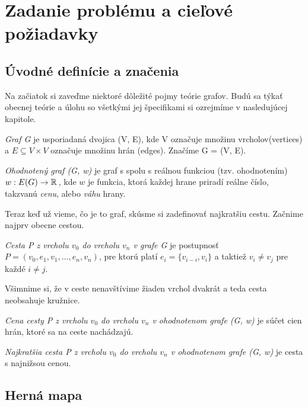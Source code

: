 \chapter{Zadanie problému a cieľové požiadavky}

\section{Úvodné definície a značenia}
Na začiatok si zaveďme niektoré dôležité pojmy teórie grafov.
Budú sa týkať obecnej teórie a úlohu so všetkými jej špecifikami si ozrejmíme v nasledujúcej kapitole.
\begin{define}
{\sl Graf G} je usporiadaná dvojica (V, E), kde V označuje množinu vrcholov(vertices) a $E \subseteq V \times V $ označuje množinu hrán (edges). Značíme G = (V, E).
\end{define}

\begin{define}
{\sl Ohodnotený graf (G, w)} je graf s spolu s reálnou funkciou (tzv. ohodnotením)
$w: E(G) \to \mathbb{R}\,$, kde $w$ je funkcia, ktorá každej hrane priradí
reálne číslo, takzvanú \emph{cenu}, alebo \emph{váhu} hrany.
\end{define}


Teraz keď už vieme, čo je to graf, skúsme si zadefinovať najkratšiu cestu. Začnime najprv obecne cestou.

\begin{define}
{\sl Cesta P z vrcholu $v_0$ do vrcholu $v_n$ v grafe G } je postupnosť $P = (v_{0},e_{1},v_{1},\dots, e_{n}, v_{n})$,
pre ktorú platí $e_{i} = \{v_{i-i},v_{i}\}$ a taktiež
$v_{i} \ne v_{j}$ pre každé $i \ne j$.
\end{define}

Všimnime si, že v ceste nenavštívime žiaden vrchol dvakrát a teda cesta neobsahuje kružnice.

\begin{define}
{\sl Cena cesty P z vrcholu $v_0$ do vrcholu $v_n$ v ohodnotenom grafe (G, w) } je súčet cien hrán, ktoré sa na ceste nachádzajú.
\end{define}

\begin{define}
{\sl Najkratšia cesta P z vrcholu $v_0$ do vrcholu $v_n$
v ohodnotenom grafe (G, w)} 
je cesta s najnižsou cenou.
\end{define}





\section{Herná mapa}

